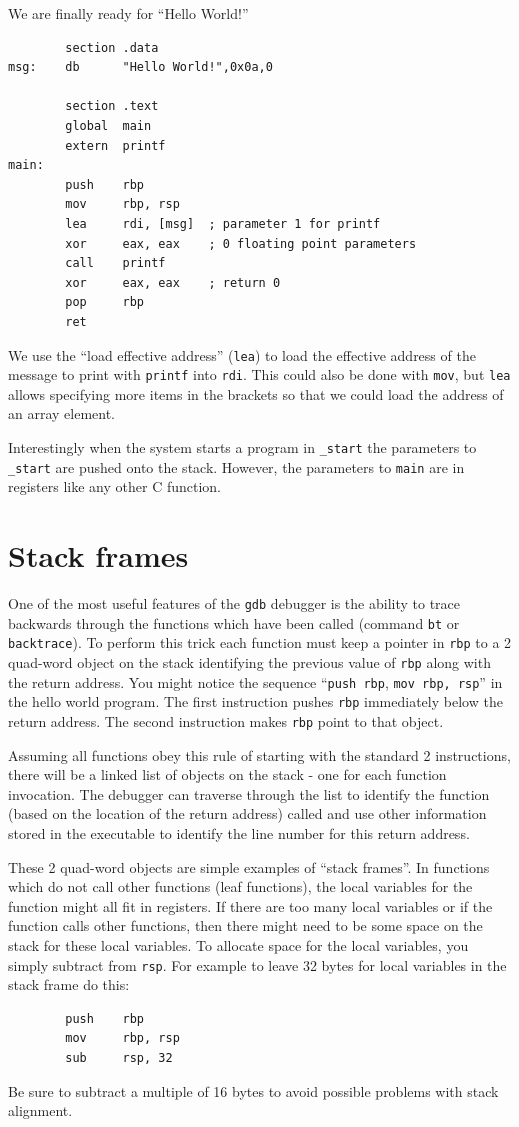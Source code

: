 \documentclass[11pt,b5paper]{book}
\begin{document}
We are finally ready for ``Hello World!''

\begin{verbatim}
        section .data
msg:    db      "Hello World!",0x0a,0

        section .text
        global  main
        extern  printf
main:
        push    rbp
        mov     rbp, rsp
        lea     rdi, [msg]  ; parameter 1 for printf
        xor     eax, eax    ; 0 floating point parameters
        call    printf
        xor     eax, eax    ; return 0
        pop     rbp
        ret
\end{verbatim}

We use the ``load effective address'' ({\tt lea}) to load the effective address
of the message to print with {\tt printf} into {\tt rdi}.
This could also be done with {\tt mov}, but {\tt lea} allows specifying more
items in the brackets so that we could load the address of an array element.

Interestingly when the system starts a program in {\tt \_start} the parameters to {\tt \_start} are pushed onto the
stack.
However, the parameters to {\tt main} are in registers like any other C function.

\section{Stack frames}

One of the most useful features of the {\tt gdb} debugger is the ability to trace backwards through the 
functions which have been called (command {\tt bt} or {\tt backtrace}).
To perform this trick each function must keep a pointer in {\tt rbp} to a 2 quad-word object on the stack
identifying the previous value of {\tt rbp} along with the return address.
You might notice the sequence ``{\tt push rbp}, {\tt mov rbp, rsp}'' in the hello world program.
The first instruction pushes {\tt rbp} immediately below the return address.
The second instruction makes {\tt rbp} point to that object.

Assuming all functions obey this rule of starting with the standard 2 instructions, there will be a linked
list of objects on the stack - one for each function invocation.
The debugger can traverse through the list to identify the function (based on the location of the return
address) called and use other information stored in the executable to identify the line number for this
return address.

These 2 quad-word objects are simple examples of ``stack frames''.
In functions which do not call other functions (leaf functions), the local variables for the function might all
fit in registers.
If there are too many local variables or if the function calls other functions, then there might need to be some
space on the stack for these local variables.
To allocate space for the local variables, you simply subtract from {\tt rsp}.
For example to leave 32 bytes for local variables in the stack frame do this:
\begin{verbatim}
        push    rbp
        mov     rbp, rsp
        sub     rsp, 32
\end{verbatim}
Be sure to subtract a multiple of 16 bytes to avoid possible problems with stack alignment.
\end{document}
